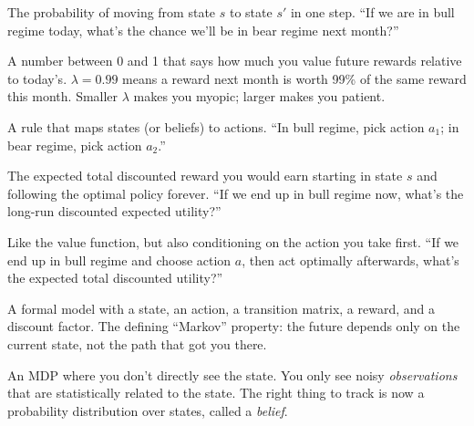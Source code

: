 \documentclass[11pt]{article}
\begin{document}
\begin{definition}
The probability of moving from state $s$ to state $s'$ in one step. ``If we are in bull regime today, what's the chance we'll be in bear regime next month?''
\end{definition}

\begin{definition}
A number between 0 and 1 that says how much you value future rewards relative to today's. $\lambda = 0.99$ means a reward next month is worth 99\% of the same reward this month. Smaller $\lambda$ makes you myopic; larger makes you patient.
\end{definition}

\begin{definition}[Policy $\pi$]
A rule that maps states (or beliefs) to actions. ``In bull regime, pick action $a_1$; in bear regime, pick action $a_2$.''
\end{definition}

\begin{definition}
The expected total discounted reward you would earn starting in state $s$ and following the optimal policy forever. ``If we end up in bull regime now, what's the long-run discounted expected utility?''
\end{definition}

\begin{definition}[Q-function $Q^*(s,a)$]
Like the value function, but also conditioning on the action you take first. ``If we end up in bull regime and choose action $a$, then act optimally afterwards, what's the expected total discounted utility?''
\end{definition}

\begin{definition}
A formal model with a state, an action, a transition matrix, a reward, and a discount factor. The defining ``Markov'' property: the future depends only on the current state, not the path that got you there.
\end{definition}

\begin{definition}
An MDP where you don't directly see the state. You only see noisy \emph{observations} that are statistically related to the state. The right thing to track is now a probability distribution over states, called a \emph{belief}.
\end{definition}
\end{document}
